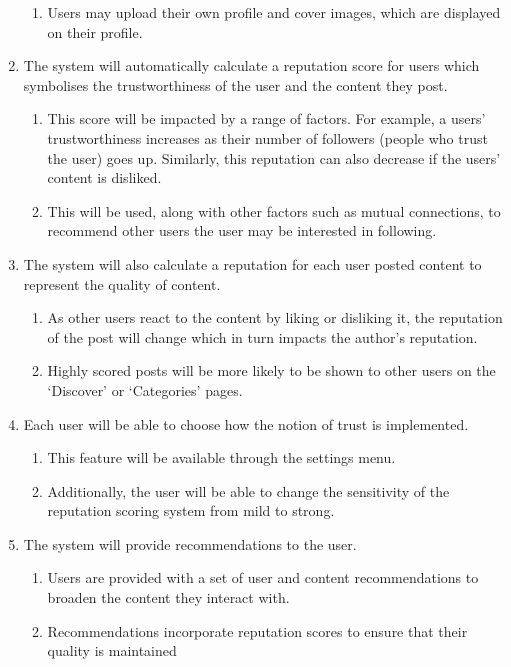 \begin{enumerate}[label=\textbf{F\arabic*}]
		\begin{enumerate}
			\item Users may upload their own profile and cover images, which are displayed on their profile.
		\end{enumerate}
	\item The system will automatically calculate a reputation score for users which symbolises the trustworthiness of the user and the content they post.
		\begin{enumerate}
			\item This score will be impacted by a range of factors. For example, a users' trustworthiness increases as their number of followers (people who trust the user) goes up. Similarly, this reputation can also decrease if the users' content is disliked.
			\item This will be used, along with other factors such as mutual connections, to recommend other users the user may be interested in following.
		\end{enumerate}
	\item The system will also calculate a reputation for each user posted content to represent the quality of content.
		\begin{enumerate}
			\item As other users react to the content by liking or disliking it, the reputation of the post will change which in turn impacts the author's reputation.
			\item Highly scored posts will be more likely to be shown to other users on the `Discover' or `Categories' pages.
		\end{enumerate}
	\item Each user will be able to choose how the notion of trust is implemented.
		\begin{enumerate}
			\item This feature will be available through the settings menu. 
			\item Additionally, the user will be able to change the sensitivity of the reputation scoring system from mild to strong.
		\end{enumerate}
	\item The system will provide recommendations to the user.
	\begin{enumerate}
		\item Users are provided with a set of user and content recommendations to broaden the content they interact with.
		\item Recommendations incorporate reputation scores to ensure that their quality is maintained	

\end{enumerate}
\end{enumerate}
